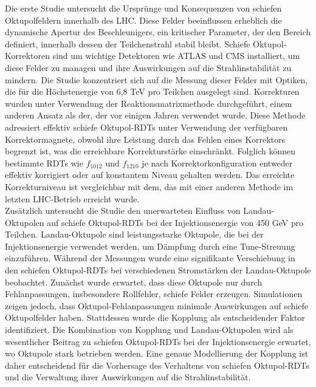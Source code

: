 {%
Die erste Studie untersucht die Ursprünge und Konsequenzen von schiefen Oktupolfeldern innerhalb des
LHC. Diese Felder beeinflussen erheblich die dynamische Apertur des Beschleunigers, ein kritischer
Parameter, der den Bereich definiert, innerhalb dessen der Teilchenstrahl stabil bleibt. Schiefe
Oktupol-Korrektoren sind um wichtige Detektoren wie ATLAS und CMS installiert, um diese Felder zu
managen und ihre Auswirkungen auf die Strahlinstabilität zu mindern. Die Studie konzentriert sich
auf die Messung dieser Felder mit Optiken, die für die Höchstenergie von 6,8 TeV pro Teilchen
ausgelegt sind. Korrekturen wurden unter Verwendung der Reaktionsmatrixmethode durchgeführt, einem
anderen Ansatz als der, der vor einigen Jahren verwendet wurde. Diese Methode adressiert effektiv
schiefe Oktupol-RDTs unter Verwendung der verfügbaren Korrektormagnete, obwohl ihre Leistung durch
das Fehlen eines Korrektors begrenzt ist, was die erreichbare Korrekturstärke einschränkt. Folglich
können bestimmte RDTs wie $f_{1012}$ und $f_{1210}$ je nach Korrektorkonfiguration entweder effektiv
korrigiert oder auf konstantem Niveau gehalten werden. Das erreichte Korrekturniveau ist
vergleichbar mit dem, das mit einer anderen Methode im letzten LHC-Betrieb erreicht wurde.\\
\indent
Zusätzlich untersucht die Studie den unerwarteten Einfluss von Landau-Oktupolen auf schiefe
Oktupol-RDTs bei der Injektionsenergie von 450 GeV pro Teilchen. Landau-Oktupole sind
leistungsstarke Oktupole, die bei der Injektionsenergie verwendet werden, um Dämpfung durch eine
Tune-Streuung einzuführen. Während der Messungen wurde eine signifikante Verschiebung in den
schiefen Oktupol-RDTs bei verschiedenen Stromstärken der Landau-Oktupole beobachtet. Zunächst wurde
erwartet, dass diese Oktupole nur durch Fehlanpassungen, insbesondere Rollfehler, schiefe Felder
erzeugen. Simulationen zeigen jedoch, dass Oktupol-Fehlanpassungen minimale Auswirkungen auf schiefe
Oktupolfelder haben. Stattdessen wurde die Kopplung als entscheidender Faktor identifiziert. Die
Kombination von Kopplung und Landau-Oktupolen wird als wesentlicher Beitrag zu schiefen Oktupol-RDTs
bei der Injektionsenergie erwartet, wo Oktupole stark betrieben werden. Eine genaue Modellierung der
Kopplung ist daher entscheidend für die Vorhersage des Verhaltens von schiefen Oktupol-RDTs und die
Verwaltung ihrer Auswirkungen auf die Strahlinstabilität.

}

